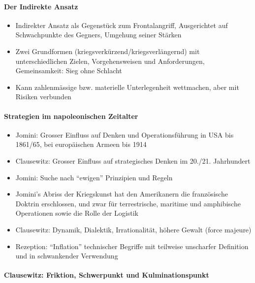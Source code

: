 {}\documentclass[a4paper]{article}
\providecommand{\tightlist}{\setlength{\itemsep}{1mm}\setlength{\parskip}{1mm}}
\begin{document}
\paragraph{Der Indirekte Ansatz}\label{der-indirekte-ansatz}

\begin{itemize}
	\tightlist
	\item
	      Indirekter Ansatz als Gegenstück zum Frontalangriff, Ausgerichtet auf
	      Schwachpunkte des Gegners, Umgehung seiner Stärken
	\item
	      Zwei Grundformen (kriegsverkürzend/kriegsverlängernd) mit
	      unterschiedlichen Zielen, Vorgehensweisen und Anforderungen,
	      Gemeinsamkeit: Sieg ohne Schlacht
	\item
	      Kann zahlenmässige bzw. materielle Unterlegenheit wettmachen, aber mit
	      Risiken verbunden
\end{itemize}

\paragraph{Strategien im napoleonischen
	Zeitalter}\label{strategien-im-napoleonischen-zeitalter}

\begin{itemize}
	\tightlist
	\item
	      Jomini: Grosser Einfluss auf Denken und Operationsführung in USA bis
	      1861/65, bei europäischen Armeen bis 1914
	\item
	      Clausewitz: Grosser Einfluss auf strategisches Denken im 20./21.
	      Jahrhundert
	\item
	      Jomini: Suche nach ``ewigen'' Prinzipien und Regeln
	\item
	      Jomini's Abriss der Kriegskunst hat den Amerikanern die französische
	      Doktrin erschlossen, und zwar für terrestrische, maritime und
	      amphibische Operationen sowie die Rolle der Logistik
	\item
	      Clausewitz: Dynamik, Dialektik, Irrationalität, höhere Gewalt (force
	      majeure)
	\item
	      Rezeption: ``Inflation'' technischer Begriffe mit teilweise unscharfer
	      Definition und in schwankender Verwendung
\end{itemize}

\paragraph{Clausewitz: Friktion, Schwerpunkt und
	Kulminationspunkt}\label{clausewitz-friktion-schwerpunkt-und-kulminationspunkt}
\end{document}
